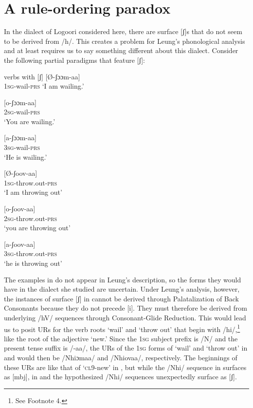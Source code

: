\documentclass[output=paper]{langsci/langscibook}
\begin{document}
\section{A rule-ordering paradox}

In the dialect of Logoori considered here, there are surface [ʃ]s that do not seem to be derived from /h/. This creates a problem for Leung’s phonological analysis and at least requires us to say something different about this dialect. Consider the following partial paradigms that feature [ʃ]:


\ea\label{ex:glewwe:19}
{verbs with [ʃ]}
  \ea\label{ex:glewwe:19a}
  [Ø-ʃɔɔm-aa] \\
\textsc{1sg}-wail-\textsc{prs}  
\glt ‘I am wailing.’


\ex\label{ex:glewwe:19b}{}
 [o-ʃɔɔm-aa] \\
\textsc{2sg}-wail-\textsc{prs}  \\
\glt ‘You are wailing.’


\ex\label{ex:glewwe:19c}{} 
[a-ʃɔɔm-aa] \\
\textsc{3sg}-wail-\textsc{prs}\\
\glt ‘He is wailing.’


\ex\label{ex:glewwe:19d}{} 
[Ø-ʃoov-aa]  \\
\textsc{1sg}-throw.out-\textsc{prs} \\
\glt ‘I am throwing out’


\ex\label{ex:glewwe:19e}{}
 [o-ʃoov-aa]  \\
\textsc{2sg}-throw.out-\textsc{prs} \\
\glt ‘you are throwing out’

\ex\label{ex:glewwe:19f}{}
 [a-ʃoov-aa]  \\
\textsc{3sg}-throw.out-\textsc{prs} \\
\glt ‘he is throwing out’
\z
\z 

The examples in  do not appear in Leung’s description, so the forms they would have in the dialect she studied are uncertain. Under Leung’s analysis, however, the instances of surface [ʃ] in  cannot be derived through Palatalization of Back Consonants because they do not precede [i]. They must therefore be derived from underlying /hV/ sequences through Consonant-Glide Reduction. This would lead us to posit URs for the verb roots ‘wail’ and ‘throw out’ that begin with /hi/,\footnote{See Footnote 4.} like the root of the adjective ‘new.’ Since the 1\textsc{sg} subject prefix is /N/ and the present tense suffix is /-aa/, the URs of the 1\textsc{sg} forms of ‘wail’ and ‘throw out’ in  and  would then be /Nhiɔmaa/ and /Nhiovaa/, respectively. The beginnings of these URs are like that of ‘\textsc{cl}9-new’ in , but while the /Nhi/ sequence in  surfaces as [mbj], in  and  the hypothesized /Nhi/ sequences unexpectedly surface as [ʃ]. 
\end{document}
